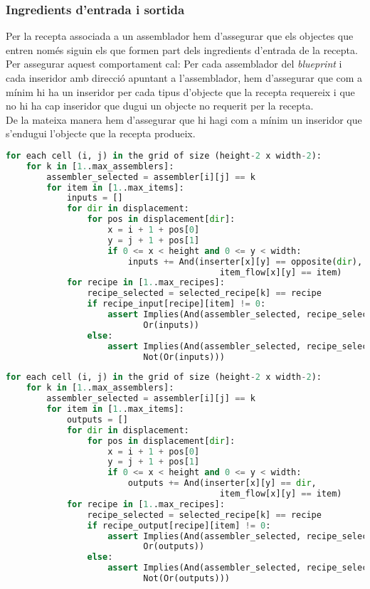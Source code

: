 \subsubsection{Ingredients d'entrada i sortida}
Per la recepta associada a un assemblador hem d'assegurar que els objectes que entren només siguin els que formen part dels ingredients d'entrada de la recepta. Per assegurar aquest comportament cal:
Per cada assemblador del \textit{blueprint} i cada inseridor amb direcció apuntant a l'assemblador, hem d'assegurar que com a mínim hi ha un inseridor per cada tipus d'objecte que la recepta requereix i que no hi ha cap inseridor que dugui un objecte no requerit per la recepta.\\
De la mateixa manera hem d'assegurar que hi hagi com a mínim un inseridor que s'endugui l'objecte que la recepta produeix.

\begin{lstlisting}[language=Python, caption=Assembler Input]
for each cell (i, j) in the grid of size (height-2 x width-2):
    for k in [1..max_assemblers]:
        assembler_selected = assembler[i][j] == k
        for item in [1..max_items]:
            inputs = []
            for dir in displacement:
                for pos in displacement[dir]:
                    x = i + 1 + pos[0]
                    y = j + 1 + pos[1]
                    if 0 <= x < height and 0 <= y < width:
                        inputs += And(inserter[x][y] == opposite(dir),
                                          item_flow[x][y] == item)
            for recipe in [1..max_recipes]:
                recipe_selected = selected_recipe[k] == recipe
                if recipe_input[recipe][item] != 0:
                    assert Implies(And(assembler_selected, recipe_selected),
                           Or(inputs))
                else:
                    assert Implies(And(assembler_selected, recipe_selected),
                           Not(Or(inputs)))
\end{lstlisting}

\begin{lstlisting}[language=Python, caption=Assembler Output]
for each cell (i, j) in the grid of size (height-2 x width-2):
    for k in [1..max_assemblers]:
        assembler_selected = assembler[i][j] == k
        for item in [1..max_items]:
            outputs = []
            for dir in displacement:
                for pos in displacement[dir]:
                    x = i + 1 + pos[0]
                    y = j + 1 + pos[1]
                    if 0 <= x < height and 0 <= y < width:
                        outputs += And(inserter[x][y] == dir,
                                          item_flow[x][y] == item)
            for recipe in [1..max_recipes]:
                recipe_selected = selected_recipe[k] == recipe
                if recipe_output[recipe][item] != 0:
                    assert Implies(And(assembler_selected, recipe_selected),
                           Or(outputs))
                else:
                    assert Implies(And(assembler_selected, recipe_selected),
                           Not(Or(outputs)))
\end{lstlisting}

